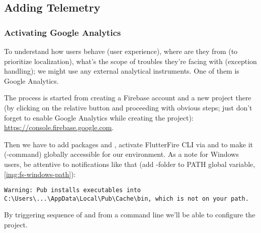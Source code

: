 
\subsection{Adding Telemetry}

\subsubsection{Activating Google Analytics}

To understand how users behave (user experience), where are they from (to prioritize localization), what's the scope of
troubles they're facing with (exception handling); we might use any external analytical instruments. One of them is 
Google Analytics.

The process is started from creating a Firebase account and a new project there (by clicking on the relative 
button and proceeding with obvious steps; just don't forget to enable Google Analytics while creating the project): 
\href{https://console.firebase.google.com}{https://console.firebase.google.com}.

Then we have to add packages  and , activate 
FlutterFire CLI  via  and  to make it 
(-command) globally accessible for our environment. As a note for Windows users, be attentive to 
notifications like that (add -folder to PATH global variable, \cref{img:fs-windows-path}):

\begin{lstlisting}[language=terminal]
Warning: Pub installs executables into C:\Users\...\AppData\Local\Pub\Cache\bin, which is not on your path.
\end{lstlisting}

\noindent By triggering sequence of  and  from a command line 
we'll be able to configure the project.

